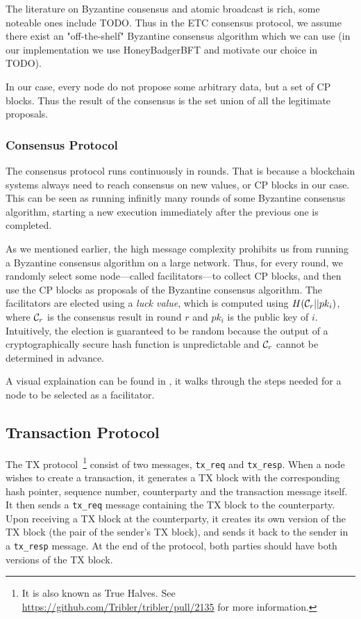 The literature on Byzantine consensus and atomic broadcast is rich, some noteable ones include TODO.
Thus in the ETC consensus protocol, we assume there exist an "off-the-shelf" Byzantine consensus algorithm which we can use
(in our implementation we use HoneyBadgerBFT and motivate our choice in TODO).

In our case, every node do not propose some arbitrary data, but a set of CP blocks.
Thus the result of the consensus is the set union of all the legitimate proposals.

\subsubsection*{Consensus Protocol} 
The consensus protocol runs continuously in rounds.
That is because a blockchain systems always need to reach consensus on new values, or CP blocks in our case.
This can be seen as running infinitly many rounds of some Byzantine consensus algorithm,
starting a new execution immediately after the previous one is completed.

As we mentioned earlier, the high message complexity prohibits us from running a Byzantine consensus algorithm on a large network.
Thus, for every round, we randomly select some node---called facilitators---to collect CP blocks,
and then use the CP blocks as proposals of the Byzantine consensus algorithm.
The facilitators are elected using a \emph{luck value}, which is computed using $H(\mathcal{C}_r || pk_i)$,
where $\mathcal{C}_r$ is the consensus result in round $r$ and $pk_i$ is the public key of $i$.
Intuitively, the election is guaranteed to be random 
because the output of a cryptographically secure hash function is unpredictable and $\mathcal{C}_r$ cannot be determined in advance.

A visual explaination can be found in ,
it walks through the steps needed for a node to be selected as a facilitator.

\subsection{Transaction Protocol}
The TX protocol~\footnote{It is also known as True Halves.
See \url{https://github.com/Tribler/tribler/pull/2135} for more information.}
consist of two messages, \texttt{tx\_req} and \texttt{tx\_resp}.
When a node  wishes to create a transaction,
it generates a TX block with the corresponding hash pointer, sequence number, counterparty and the transaction message itself.
It then sends a \texttt{tx\_req} message containing the TX block to the counterparty.
Upon receiving a TX block at the counterparty, it creates its own version of the TX block (the pair of the sender's TX block),
and sends it back to the sender in a \texttt{tx\_resp} message.
At the end of the protocol, both parties should have both versions of the TX block.

